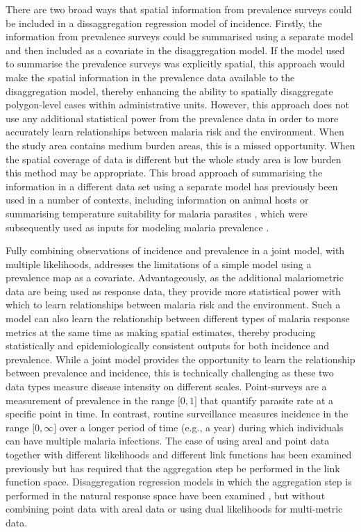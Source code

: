 \documentclass{statsoc}
\begin{document}
There are two broad ways that spatial information from prevalence surveys could be included in a dissaggregation regression model of incidence.
Firstly, the information from prevalence surveys could be summarised using a separate model and then included as a covariate in the disaggregation model.
If the model used to summarise the prevalence surveys was explicitly spatial, this approach would make the spatial information in the prevalence data available to the disaggregation model, thereby enhancing the ability to spatially disaggregate polygon-level cases within administrative units.
However, this approach does not use any additional statistical power  from the prevalence data in order to more accurately learn relationships between malaria risk and the environment.
When the study area contains medium burden areas, this is a missed opportunity.
When the spatial coverage of data is different but the whole study area is low burden this method may be appropriate.
This broad approach of summarising the information in a different data set using a separate model has previously been used in a number of contexts, including information on animal hosts \citep{shearer2016estimating} or summarising temperature suitability for malaria parasites \citep{weiss2014air}, which were subsequently used as inputs for modeling malaria prevalence \citep{bhatt2015effect, weiss2019mapping}.


Fully combining observations of incidence and prevalence in a joint model, with multiple likelihoods, addresses the limitations of a simple model using a prevalence map as a covariate.
Advantageously, as the additional malariometric data are being used as response data, they provide more statistical power with which to learn relationships between malaria risk and the environment.
Such a model can also learn the relationship between different types of malaria response metrics at the same time as making spatial estimates, thereby producing statistically and epidemiologically consistent outputs for both incidence and prevalence.
While a joint model provides the opportunity to learn the relationship between prevalence and incidence, this is technically challenging as these two data types measure disease intensity on different scales.
Point-surveys are a measurement of prevalence in the range $\lbrack 0, 1\rbrack$ that quantify parasite rate at a specific point in time.
In contrast, routine surveillance measures incidence in the range $\lbrack 0, \infty\rbrack$ over a longer period of time (e.g., a year) during which individuals can have multiple malaria infections.
The case of using areal and point data together with different likelihoods and different link functions has been examined previously \citep{wang2018generalized} but has required that the aggregation step be performed in the link function space. 
Disaggregation regression models in which the aggregation step is performed in the natural response space have been examined \citep{wilson2017pointless, taylor2017continuous}, but without combining point data with areal data or using dual likelihoods for multi-metric data.
\end{document}
